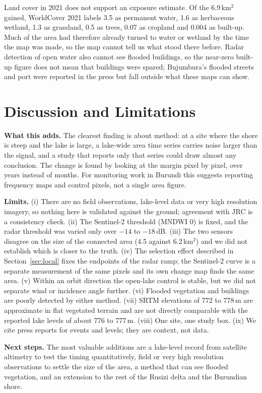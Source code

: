 \documentclass[conference]{IEEEtran}
\begin{document}
Land cover in 2021 does not support an exposure estimate. Of the 6.9\,km$^2$ gained, WorldCover 2021 labels 3.5 as permanent water, 1.6 as herbaceous wetland, 1.3 as grassland, 0.5 as trees, 0.07 as cropland and 0.004 as built-up. Much of the area had therefore already turned to water or wetland by the time the map was made, so the map cannot tell us what stood there before. Radar detection of open water also cannot see flooded buildings, so the near-zero built-up figure does not mean that buildings were spared; Bujumbura's flooded streets and port were reported in the press but fall outside what these maps can show.

\section{Discussion and Limitations}

\textbf{What this adds.} The clearest finding is about method: at a site where the shore is steep and the lake is large, a lake-wide area time series carries noise larger than the signal, and a study that reports only that series could draw almost any conclusion. The change is found by looking at the margin pixel by pixel, over years instead of months. For monitoring work in Burundi this suggests reporting frequency maps and control pixels, not a single area figure.

\textbf{Limits.} (i) There are no field observations, lake-level data or very high resolution imagery, so nothing here is validated against the ground; agreement with JRC is a consistency check. (ii) The Sentinel-2 threshold (MNDWI 0) is fixed, and the radar threshold was varied only over $-14$ to $-18$\,dB. (iii) The two sensors disagree on the size of the connected area (4.5 against 6.2\,km$^2$) and we did not establish which is closer to the truth. (iv) The selection effect described in Section~\ref{sec:local} fixes the endpoints of the radar ramp; the Sentinel-2 curve is a separate measurement of the same pixels and its own change map finds the same area. (v) Within an orbit direction the open-lake control is stable, but we did not separate wind or incidence angle further. (vi) Flooded vegetation and buildings are poorly detected by either method. (vii) SRTM elevations of 772 to 778\,m are approximate in flat vegetated terrain and are not directly comparable with the reported lake levels of about 776 to 777\,m. (viii) One site, one study box. (ix) We cite press reports for events and levels; they are context, not data.

\textbf{Next steps.} The most valuable additions are a lake-level record from satellite altimetry to test the timing quantitatively, field or very high resolution observations to settle the size of the area, a method that can see flooded vegetation, and an extension to the rest of the Rusizi delta and the Burundian shore.
\end{document}
